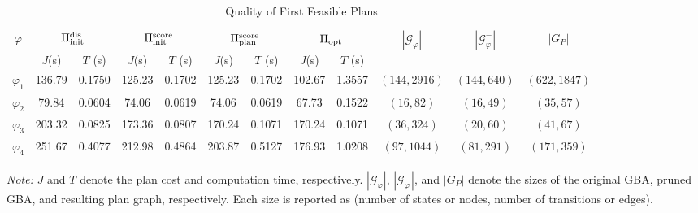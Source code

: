 \documentclass[lettersize,journal]{IEEEtran}
\theoremstyle{italiclemma}
\theoremstyle{italiclemma}
\theoremstyle{definition}
\begin{document}
\begin{table}[!t]
\centering
\begin{threeparttable}
\caption{Quality of First Feasible Plans}
\label{tab:first_solution_quality}
\scriptsize
\setlength{\tabcolsep}{3.2pt}
\renewcommand{\arraystretch}{1.10}

\begin{tabular}{@{}c|
S[table-format=3.2,round-mode=places,round-precision=2]
S[table-format=1.2,round-mode=places,round-precision=2]
S[table-format=3.2,round-mode=places,round-precision=2]
S[table-format=1.2,round-mode=places,round-precision=2]
S[table-format=3.2,round-mode=places,round-precision=2]
S[table-format=1.2,round-mode=places,round-precision=2]
S[table-format=3.2,round-mode=places,round-precision=2]
S[table-format=1.2,round-mode=places,round-precision=2]
|ccc@{}}

\toprule

& 
& 
& 
& 
& 
& 
&  \\

\cmidrule(lr){2-3}
\cmidrule(lr){4-5}
\cmidrule(lr){6-7}
\cmidrule(lr){8-9}

& {$J$(s)} & {$T$ (s)}
& {$J$(s)} & {$T$ (s)}
& {$J$(s)} & {$T$ (s)}
& {$J$(s)} & {$T$ (s)}
& & & \\

\midrule

$\varphi_1$
& 136.79 & 0.1750
& 125.23 & 0.1702
& 125.23 & 0.1702
& 102.67 & 1.3557
& $(144,2916)$ & $(144,640)$ & $(622,1847)$ \\

$\varphi_2$
& 79.84 & 0.0604
& 74.06 & 0.0619
& 74.06 & 0.0619
& 67.73 & 0.1522
& $(16,82)$ & $(16,49)$ & $(35,57)$ \\

$\varphi_3$
& 203.32 & 0.0825
& 173.36 & 0.0807
& 170.24 & 0.1071
& 170.24 & 0.1071
& $(36,324)$ & $(20,60)$ & $(41,67)$ \\

$\varphi_4$
& 251.67 & 0.4077
& 212.98 & 0.4864
& 203.87 & 0.5127
& 176.93 & 1.0208
& $(97,1044)$ & $(81,291)$ & $(171,359)$ \\

\bottomrule
\end{tabular}
\vspace{1mm}
\begin{tablenotes}[flushleft]
\footnotesize
\item[] \emph{Note:}
$J$ and $T$ denote the plan cost and computation
time, respectively. $|\mathcal G_\varphi|$, $|\mathcal G_\varphi^-|$, and $|G_P|$ denote the sizes of the original GBA, pruned GBA, and resulting plan graph, respectively. Each size is reported as (number of states or nodes, number of transitions or edges).
\end{tablenotes}
\end{threeparttable}
\end{table}
\end{document}
